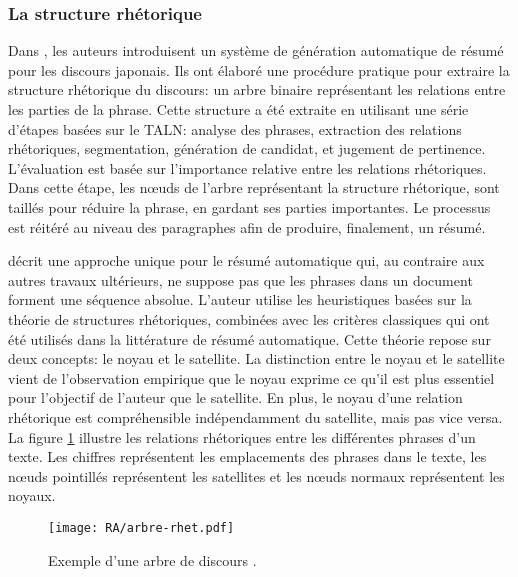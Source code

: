 \documentclass[a4paper,12pt,oneside]{../use/ESIthesis}
\begin{document}
\subsubsection{La structure rhétorique}

Dans \cite{94-ono}, les auteurs introduisent un système de génération automatique de résumé pour les discours japonais. 
Ils ont élaboré une procédure pratique pour extraire la structure rhétorique du discours: un arbre binaire représentant les relations entre les parties de la phrase. 
Cette structure a été extraite en utilisant une série d'étapes basées sur le TALN: analyse des phrases, extraction des relations rhétoriques, segmentation, génération de candidat, et jugement de pertinence. 
L'évaluation est basée sur l'importance relative entre les relations rhétoriques.
Dans cette étape, les nœuds de l'arbre représentant la structure rhétorique, sont taillés pour réduire la phrase, en gardant ses parties importantes. 
Le processus est réitéré au niveau des paragraphes afin de produire, finalement, un résumé.

\cite{98-marcu} décrit une approche unique pour le résumé automatique qui, au contraire aux autres travaux ultérieurs, ne suppose pas que les phrases dans un document forment une séquence absolue. 
L'auteur utilise les heuristiques basées sur la théorie de structures rhétoriques, combinées avec les critères classiques qui ont été utilisés dans la littérature de résumé automatique. 
Cette théorie repose sur deux concepts: le noyau et le satellite. 
La distinction entre le noyau et le satellite vient de l'observation empirique que le noyau exprime ce qu'il est plus essentiel pour l'objectif de l'auteur que le satellite. 
En plus, le noyau d'une relation rhétorique est compréhensible indépendamment du satellite, mais pas vice versa. 
La figure \ref{fig:arbre-rhet} illustre les relations rhétoriques entre les différentes phrases d'un texte. 
Les chiffres représentent les emplacements des phrases dans le texte, les nœuds pointillés représentent les satellites et les nœuds normaux représentent les noyaux.
\begin{figure}[ht]
\begin{center}
\texttt{[image: RA/arbre-rhet.pdf]} %
 \caption[Exemple d'une arbre de discours]{Exemple d'une arbre de discours \cite{98-marcu}.}
 \label{fig:arbre-rhet}
\end{center}
\end{figure}
\end{document}
